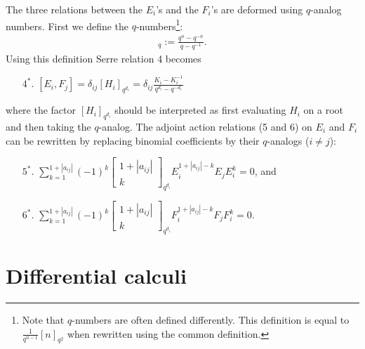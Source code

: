 \begin{construct}
        The three relations between the $E_i$'s and the $F_i$'s are deformed using $q$-analog numbers. First we define the $q$-numbers\footnote{Note that $q$-numbers are often defined differently. This definition is equal to $\frac{1}{q^{n-1}}[n]_{q^2}$ when rewritten using the common definition.}:
        \begin{gather}
            [n]_q := \frac{q^n - q^{-n}}{q - q^{-1}}.
        \end{gather}
        Using this definition Serre relation 4 becomes
        \begin{enumerate}
            \item[$4^*.$] $[E_i, F_j] = \delta_{ij}[H_i]_{q^{d_i}} = \delta_{ij}\frac{K_i - K_i^{-1}}{q^{d_i} - q^{-d_i}}$
        \end{enumerate}
        where the factor $[H_i]_{q^{d_i}}$ should be interpreted as first evaluating $H_i$ on a root and then taking the $q$-analog. The adjoint action relations (5 and 6) on $E_i$ and $F_i$ can be rewritten by replacing binomial coefficients by their $q$-analogs ($i\neq j$):
        \begin{enumerate}
            \item[$5^*.$] $\sum_{k=1}^{1+|a_{ij}|} (-1)^k\begin{bmatrix}1+|a_{ij}|\\k\end{bmatrix}_{q^{d_i}}E_i^{1+|a_{ij}|-k}E_jE_i^k = 0$, and
            \item[$6^*.$] $\sum_{k=1}^{1+|a_{ij}|} (-1)^k\begin{bmatrix}1+|a_{ij}|\\k\end{bmatrix}_{q^{d_i}}F_i^{1+|a_{ij}|-k}F_jF_i^k = 0$.
        \end{enumerate}
    \end{construct}

\section{Differential calculi}

